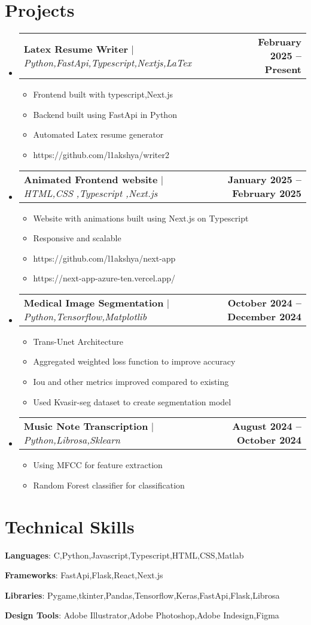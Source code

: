 \documentclass[letterpaper,11pt]{article}
\makeatletter
\newcommand{\resumeItem}[1]{
  \item\small{
    {#1 \vspace{-2pt}}
  }
}
\newcommand{\resumeProjectHeading}[2]{
    \item
    \begin{tabular*}{0.97\textwidth}{l@{\extracolsep{\fill}}r}
      \small#1 & \textbf{#2} \\
    \end{tabular*}\vspace{-7pt}
}
\newcommand{\resumeSubHeadingListStart}{\begin{itemize}[leftmargin=0.15in, label={}]}
\newcommand{\resumeSubHeadingListEnd}{\end{itemize}}
\newcommand{\resumeItemListStart}{\begin{itemize}}
\newcommand{\resumeItemListEnd}{\end{itemize}\vspace{-5pt}}
\makeatother
\begin{document}
\section{Projects}
    \resumeSubHeadingListStart
      \resumeProjectHeading
          {\textbf{Latex Resume Writer} $|$ \emph{Python,FastApi,Typescript,Nextjs,LaTex}}{February 2025 -- Present}
          \resumeItemListStart
            \resumeItem{Frontend built with typescript,Next.js}
            \resumeItem{Backend built using FastApi in Python}
            \resumeItem{Automated Latex resume generator}
            \resumeItem{https://github.com/l1akshya/writer2}
          \resumeItemListEnd
      \resumeProjectHeading
          {\textbf{Animated Frontend website} $|$ \emph{HTML,CSS ,Typescript ,Next.js}}{January 2025 -- February  2025}
          \resumeItemListStart
            \resumeItem{Website with animations built using Next.js on Typescript}
            \resumeItem{Responsive and scalable}
            \resumeItem{https://github.com/l1akshya/next-app}
            \resumeItem{https://next-app-azure-ten.vercel.app/}
          \resumeItemListEnd
      \resumeProjectHeading
          {\textbf{Medical Image Segmentation } $|$ \emph{Python,Tensorflow,Matplotlib}}{October 2024 -- December 2024}
          \resumeItemListStart
            \resumeItem{ Trans-Unet Architecture}
            \resumeItem{Aggregated weighted loss function to improve accuracy}
            \resumeItem{Iou and other metrics improved compared to existing }
            \resumeItem{Used Kvasir-seg dataset to create segmentation model}
          \resumeItemListEnd
      \resumeProjectHeading
          {\textbf{Music Note Transcription} $|$ \emph{Python,Librosa,Sklearn}}{August 2024 -- October 2024}
          \resumeItemListStart
            \resumeItem{Using MFCC for feature extraction}
            \resumeItem{Random Forest classifier for classification}
          \resumeItemListEnd
    \resumeSubHeadingListEnd

%
\section{Technical Skills}
  \begin{itemize}[leftmargin=0.15in, label={}]
    \small{\item{
     \textbf{Languages}{: C,Python,Javascript,Typescript,HTML,CSS,Matlab} 
    }}
    \small{\item{
     \textbf{Frameworks}{: FastApi,Flask,React,Next.js} 
    }}
    \small{\item{
     \textbf{Libraries}{: Pygame,tkinter,Pandas,Tensorflow,Keras,FastApi,Flask,Librosa} 
    }}
    \small{\item{
     \textbf{Design Tools}{: Adobe Illustrator,Adobe Photoshop,Adobe Indesign,Figma} 
    }}
 \end{itemize}


\end{document}
